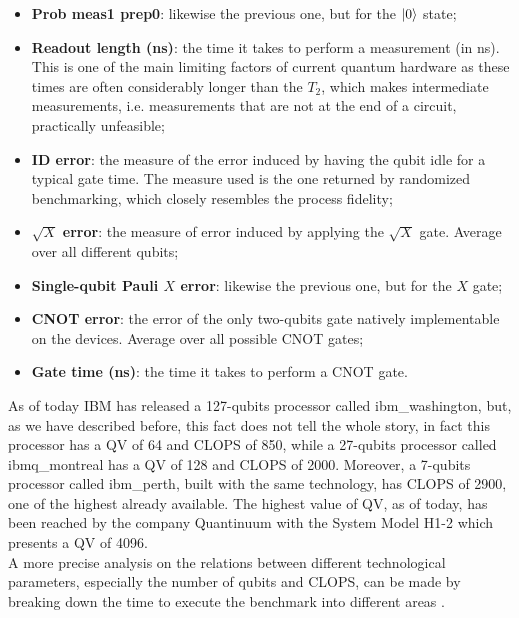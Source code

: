 \begin{itemize}
    \item \textbf{Prob meas1 prep0}: likewise the previous one, but for the $\ket{0}$ state;
    
    \item \textbf{Readout length (ns)}: the time it takes to perform a measurement (in ns). This is one of the main limiting factors of current quantum hardware as these times are often considerably longer than the $T_2$, which makes intermediate measurements, i.e. measurements that are not at the end of a circuit, practically unfeasible;
    
    \item \textbf{ID error}: the measure of the error induced by having the qubit idle for a typical gate time. The measure used is the one returned by randomized benchmarking, which closely resembles the process fidelity;
    
    \item $\sqrt{X}$ \textbf{error}: the measure of error induced by applying the $\sqrt{X}$ gate. Average over all different qubits;
    
    \item \textbf{Single-qubit Pauli $X$ error}: likewise the previous one, but for the $X$ gate;
    
    \item \textbf{CNOT error}: the error of the only two-qubits gate natively implementable on the devices. Average over all possible CNOT gates;
    
    \item \textbf{Gate time (ns)}: the time it takes to perform a CNOT gate.
\end{itemize}
As of today IBM has released a 127-qubits processor called ibm\_washington, but, as we have described before, this fact does not tell the whole story, in fact this processor has a QV of 64 and CLOPS of 850, while a 27-qubits processor called ibmq\_montreal has a QV of 128 and CLOPS of 2000. Moreover, a 7-qubits processor called ibm\_perth, built with the same technology, has CLOPS of 2900, one of the highest already available. The highest value of QV, as of today, has been reached by the company Quantinuum with the System Model H1-2 which presents a QV of 4096. \\
A more precise analysis on the relations between different technological parameters, especially the number of qubits and CLOPS, can be made by breaking down the time to execute the benchmark into different areas \cite{Wack2021Oct}. \\
